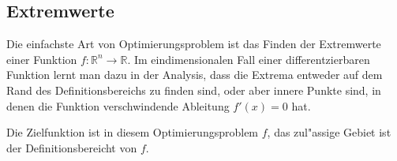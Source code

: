 \subsection{Extremwerte}
Die einfachste Art von Optimierungsproblem ist das Finden der Extremwerte
einer Funktion $f\colon\mathbb R^n\to\mathbb R$.
Im eindimensionalen Fall einer differentzierbaren Funktion lernt man dazu
in der Analysis, dass die Extrema entweder auf dem Rand des Definitionsbereichs
zu finden sind, oder aber innere Punkte sind, in denen die Funktion
verschwindende Ableitung $f'(x)=0$ hat.

Die Zielfunktion ist in diesem Optimierungsproblem $f$, das zul"assige
Gebiet ist der Definitionsbereicht von $f$.

